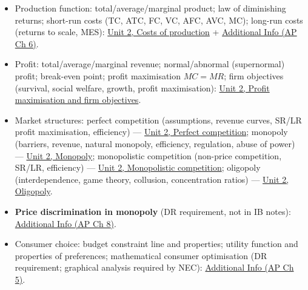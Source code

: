\documentclass[a4paper,12pt]{article}
\begin{document}
\begin{itemize}
  \item Production function: total/average/marginal product; law of diminishing returns; short-run costs (TC, ATC, FC, VC, AFC, AVC, MC); long-run costs (returns to scale, MES): \hyperref[sec:market-failure-3]{Unit 2, Costs of production} + \hyperref[sec:add-costs]{Additional Info (AP Ch 6)}.
  \item Profit: total/average/marginal revenue; normal/abnormal (supernormal) profit; break-even point; profit maximisation $MC = MR$; firm objectives (survival, social welfare, growth, profit maximisation): \hyperref[sec:market-failure-3]{Unit 2, Profit maximisation and firm objectives}.
  \item Market structures: perfect competition (assumptions, revenue curves, SR/LR profit maximisation, efficiency) --- \hyperref[sec:market-failure-3]{Unit 2, Perfect competition}; monopoly (barriers, revenue, natural monopoly, efficiency, regulation, abuse of power) --- \hyperref[sec:market-failure-3]{Unit 2, Monopoly}; monopolistic competition (non-price competition, SR/LR, efficiency) --- \hyperref[sec:market-failure-3]{Unit 2, Monopolistic competition}; oligopoly (interdependence, game theory, collusion, concentration ratios) --- \hyperref[sec:market-failure-3]{Unit 2, Oligopoly}.
  \item \textbf{Price discrimination in monopoly} (DR requirement, not in IB notes): \hyperref[sec:add-monopoly]{Additional Info (AP Ch 8)}.
  \item Consumer choice: budget constraint line and properties; utility function and properties of preferences; mathematical consumer optimisation (DR requirement; graphical analysis required by NEC): \hyperref[sec:add-consumer]{Additional Info (AP Ch 5)}.
\end{itemize}
\end{document}
